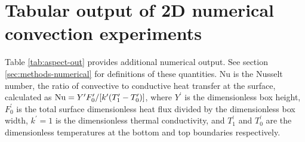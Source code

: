 \documentclass[trackchanges]{aastex63}
\begin{document}
\section{Tabular output of 2D numerical convection experiments}
\label{sec:aspect-table}

Table \ref{tab:aspect-out} provides additional numerical output. See section \ref{sec:methods-numerical} for definitions of these quantities. Nu is the Nusselt number, the ratio of convective to conductive heat transfer at the surface, calculated as ${\rm Nu} = Y^\prime F^\prime_0 / [k^\prime(T^\prime_1 - T^\prime_0)]$, where $Y^\prime$ is the dimensionless box height, $ F^\prime_0$ is the total surface dimensionless heat flux divided by the dimensionless box width, $k^\prime = 1$ is the dimensionless thermal conductivity, and $T^\prime_1$ and $T^\prime_0$ are the dimensionless temperatures at the bottom and top boundaries respectively.
\end{document}
